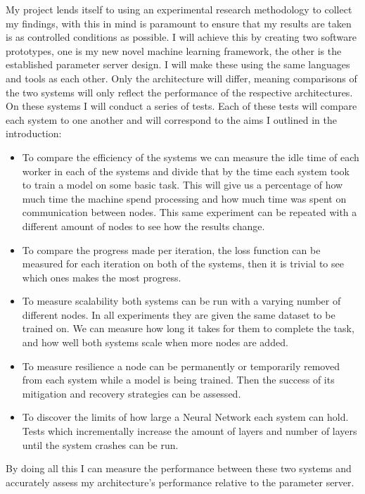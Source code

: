 My project lends itself to using an experimental research methodology to collect
my findings, with this in mind is paramount to ensure that my results are taken
is as controlled conditions as possible. I will achieve this by
creating two software prototypes, one is my new novel machine learning
framework, the other is the established parameter server design. I will make
these using the same languages and tools as each other. Only the architecture
will differ, meaning comparisons of the two systems will only reflect the
performance of the respective architectures. On these systems I will conduct a
series of tests. Each of these tests will compare each system to one another and
will correspond to the aims I outlined in the introduction:
\begin{itemize}
    \item To compare the efficiency of the systems we can measure the idle time
    of each worker in each of the systems and divide that by the time each
    system took to train a model on some basic task. This will give us a
    percentage of how much time the machine spend processing and how much time
    was spent on communication between nodes. This same experiment can be
    repeated with a different amount of nodes to see how the results change.
    \item To compare the progress made per iteration, the loss function can be
    measured for each iteration on both of the systems, then it is trivial to
    see which ones makes the most progress.
    \item To measure scalability both systems can be run with a varying number
    of different nodes. In all experiments they are given the same dataset to be
    trained on. We can measure how long it takes for them to complete the task,
    and how well both systems scale when more nodes are added.
    \item To measure resilience a node can be permanently or temporarily removed
    from each system while a model is being trained. Then the success of its
    mitigation and recovery strategies can be assessed.
    \item To discover the limits of how large a Neural Network each system can
    hold. Tests which incrementally increase the amount of layers and number of
    layers until the system crashes can be run.
\end{itemize}
By doing all this I can measure the performance between these two systems and
accurately assess my architecture's performance relative to the parameter server.

